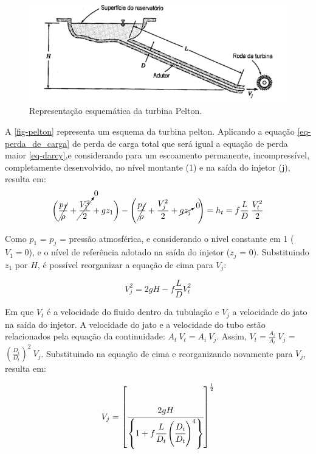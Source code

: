     \begin{figure}[htb]
        \centering
        \caption{ \label{fig-pelton} Representação esquemática da turbina Pelton.}
        \includegraphics[scale=0.6]{images/turbina_pelton_fox.png}
    \end{figure}

    A \autoref{fig-pelton} representa um esquema da turbina pelton. Aplicando a equação \eqref{eq-perda_de_carga} de perda de carga total que será igual a equação de perda maior \eqref{eq-darcy},e considerando para um escoamento permanente, incompressível, completamente desenvolvido, no nível montante (1) e na saída do injetor (j), resulta em:
    \begin{equation*}
        \bigg( \cancel{\frac{p_1}{\rho}} + \cancelto{0}{\frac{V^2_1}{2}} + gz_1 \bigg) - \left( \cancel{\frac{p_j}{\rho}} + \frac{V^2_j}{2} + \cancelto{0}{gz_j} \;\;\: \right) = h_t = f \frac{L}{D}\: \frac{V_t^2}{2}
    \end{equation*}

    Como $p_1$ = $p_j$ = pressão atmosférica, e considerando o nível constante em 1 ($V_1 = 0$), e o nível de referência adotado na saída do injetor ($z_j$ = 0). Substituindo $z_1$ por $H$, é possível reorganizar a equação de cima para $V_j$:

    \begin{equation*}
        V_j^2 = 2gH - f \frac{L}{D} V_t^2
    \end{equation*}

    Em que $V_t$ é a velocidade do fluido dentro da tubulação e $V_j$ a velocidade do jato na saída do injetor. A velocidade do jato e a velocidade do tubo estão relacionados pela equação da continuidade: $A_t\: V_t = A_i \: V_j$. Assim, $V_t =  \frac{A_i}{A_t} \: V_j$ = $\left(\frac{D_i}{D_t} \right)^2 \: V_j$. Substituindo na equação de cima e reorganizando novamente para $V_j$, resulta em:

    \begin{equation} \label{eq-jato}
        V_j = \left[ \cfrac{2gH}{\left\{1 + f\cfrac{L}{D_t} \left(\cfrac{D_i}{D_t} \right)^4 \right\}} \right]^{\frac{1}{2}}
    \end{equation}

